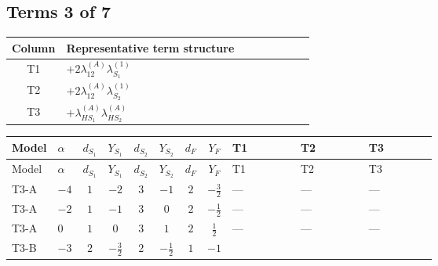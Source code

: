\documentclass[8pt]{article}
\begin{document}
\begin{landscape}
\subsection*{Terms 3 of 7}
\begin{center}
\begin{tabular}{@{}c >{\raggedright\arraybackslash}p{0.82\linewidth}@{}}
\toprule
Column & Representative term structure \\
\midrule
T1 & \(\displaystyle +2 {\lambda_{12}^{(A)}} {\lambda_{S_1}^{(1)}}\) \\
\midrule
T2 & \(\displaystyle +2 {\lambda_{12}^{(A)}} {\lambda_{S_2}^{(1)}}\) \\
\midrule
T3 & \(\displaystyle +{\lambda_{HS_1}^{(A)}} {\lambda_{HS_2}^{(A)}}\) \\
\midrule
\bottomrule
\end{tabular}
\end{center}
\smallskip
\tiny
\begin{longtable}{@{}llcccccc >{\raggedright\arraybackslash}p{0.21\linewidth} >{\raggedright\arraybackslash}p{0.21\linewidth} >{\raggedright\arraybackslash}p{0.21\linewidth}@{}}
\toprule
Model & $\alpha$ & $d_{S_1}$ & $Y_{S_1}$ & $d_{S_2}$ & $Y_{S_2}$ & $d_F$ & $Y_F$ & T1 & T2 & T3 \\
\midrule
\endfirsthead
\toprule
Model & $\alpha$ & $d_{S_1}$ & $Y_{S_1}$ & $d_{S_2}$ & $Y_{S_2}$ & $d_F$ & $Y_F$ & T1 & T2 & T3 \\
\midrule
\endhead
T3-A & $-4$ & $1$ & $-2$ & $3$ & $-1$ & $2$ & $-\frac{3}{2}$ & --- & --- & --- \\
\midrule
T3-A & $-2$ & $1$ & $-1$ & $3$ & $0$ & $2$ & $-\frac{1}{2}$ & --- & --- & --- \\
\midrule
T3-A & $0$ & $1$ & $0$ & $3$ & $1$ & $2$ & $\frac{1}{2}$ & --- & --- & --- \\
\midrule
T3-B & $-3$ & $2$ & $-\frac{3}{2}$ & $2$ & $-\frac{1}{2}$ & $1$ & $-1$ & \scriptsize\adjustbox{max width=\linewidth}{$\begin{gathered} +2 {\lambda_{12}^{(A)}} {\lambda_{S_1}^{(1)}}\end{gathered}$} & \scriptsize\adjustbox{max width=\linewidth}{$\begin{gathered} +2 {\lambda_{12}^{(A)}} {\lambda_{S_2}^{(1)}}\end{gathered}$} & \scriptsize\adjustbox{max width=\linewidth}{$\begin{gathered} +{\lambda_{HS_1}^{(A)}} {\lambda_{HS_2}^{(A)}}\end{gathered}$} \\

\end{longtable}
\end{landscape}
\end{document}
